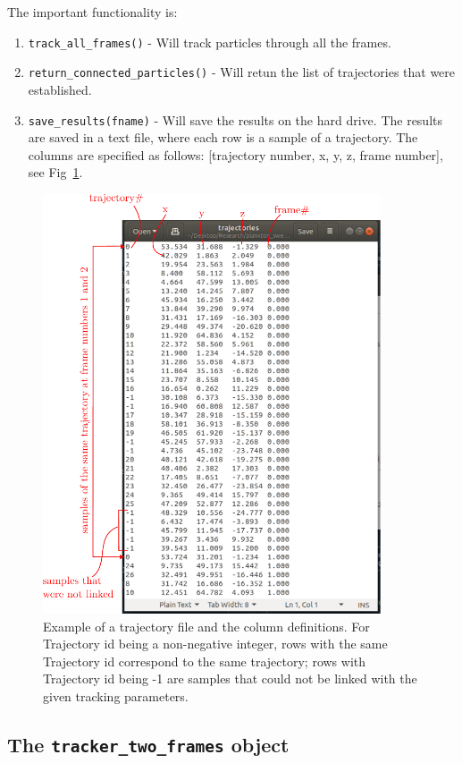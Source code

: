 \documentclass[10pt,a4paper]{article}
\begin{document}
The important functionality is:
%
\begin{enumerate}
	\item \texttt{track\_all\_frames()} - Will track particles through all the frames. 
	
	\item \texttt{return\_connected\_particles()} - Will retun the list of trajectories that were established.
	
	\item \texttt{save\_results(fname)} - Will save the results on the hard drive. The results are saved in a text file, where each row is a sample of a trajectory. The columns are specified as follows: [trajectory number, x, y, z, frame number], see Fig~\ref{fig:trajfile}.  
\end{enumerate}

\begin{figure}
	\centering
	\includegraphics[width=10cm]{trajectory_files.pdf}
	\caption{Example of a trajectory file and the column definitions. For Trajectory id being a non-negative integer, rows with the same Trajectory id correspond to the same trajectory; rows with Trajectory id being -1 are samples that could not be linked with the given tracking parameters.  \label{fig:trajfile}}
\end{figure}




\subsection{The \texttt{tracker\_two\_frames} object}
\end{document}
